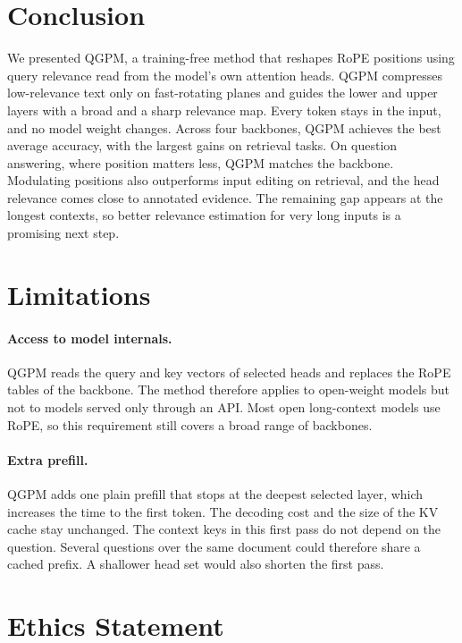 \documentclass[11pt]{article}
\begin{document}
\section{Conclusion}
\label{sec:conclusion}

We presented QGPM, a training-free method that reshapes RoPE positions using query relevance read from the model's own attention heads. QGPM compresses low-relevance text only on fast-rotating planes and guides the lower and upper layers with a broad and a sharp relevance map. Every token stays in the input, and no model weight changes. Across four backbones, QGPM achieves the best average accuracy, with the largest gains on retrieval tasks. On question answering, where position matters less, QGPM matches the backbone. Modulating positions also outperforms input editing on retrieval, and the head relevance comes close to annotated evidence. The remaining gap appears at the longest contexts, so better relevance estimation for very long inputs is a promising next step.



\section*{Limitations}

\paragraph{Access to model internals.}
QGPM reads the query and key vectors of selected heads and replaces the RoPE tables of the backbone. The method therefore applies to open-weight models but not to models served only through an API. Most open long-context models use RoPE, so this requirement still covers a broad range of backbones.
 
\paragraph{Extra prefill.}
QGPM adds one plain prefill that stops at the deepest selected layer, which increases the time to the first token. The decoding cost and the size of the KV cache stay unchanged. The context keys in this first pass do not depend on the question. Several questions over the same document could therefore share a cached prefix. A shallower head set would also shorten the first pass.


\section*{Ethics Statement}
\end{document}
